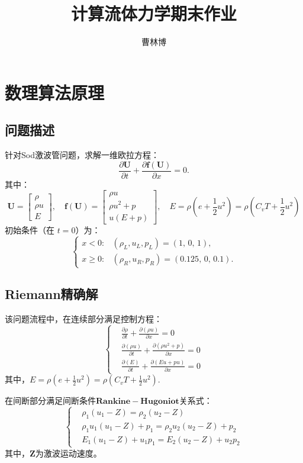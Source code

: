 \documentclass[12pt,a4paper]{article}%
\title{\fontsize{18pt}{27pt}\selectfont%
	{\heiti%
		计算流体力学期末作业}}%
\author{\fontsize{12pt}{18pt}\selectfont%
	{\fangsong%
		曹林博 \quad 2200011012}} %
\date{}%
\begin{document}
	\maketitle
	
	\section{数理算法原理}
		\subsection{问题描述}
		针对Sod激波管问题，求解一维欧拉方程：
		\[
		 	\frac{\partial \mathbf{U}}{\partial t} + \frac{\partial \mathbf{f}(\mathbf{U})}{\partial x} = 0.
		\]
		其中：
		\[
		\mathbf{U} = 
		\begin{bmatrix}
		 	\rho \\
		 	\rho u \\
		 	E
		\end{bmatrix}, \quad
		\mathbf{f}(\mathbf{U}) = 
		\begin{bmatrix}
		 	\rho u \\
		 	\rho u^2 + p \\
		 	u(E + p)
		\end{bmatrix}, \quad
		E = \rho (e + \frac12 u^2) = \rho \left( C_v T + \frac{1}{2} u^2 \right)
		\]
		初始条件（在 $t=0$）为：
		\[
		\begin{cases}
		 	x < 0: & (\rho_L, u_L, p_L) = (1,\, 0,\, 1), \\
		 	x \ge 0: & (\rho_R, u_R, p_R) = (0.125,\, 0,\, 0.1).
		\end{cases}
		\]
		
		\subsection{Riemann精确解}
		该问题流程中，在连续部分满足控制方程：
		\[
		\left\{
		\begin{aligned}
		 	&\frac{\partial \rho}{\partial t} + \frac{\partial (\rho u)}{\partial x} = 0 \\
		 	&\frac{\partial (\rho u)}{\partial t} + \frac{\partial (\rho u^2 + p)}{\partial x} = 0 \\
		 	&\frac{\partial (E)}{\partial t} + \frac{\partial (E u + p u)}{\partial x} = 0
		\end{aligned}
		\right.
		\]
		其中，$E = \rho (e + \frac12 u^2) = \rho (C_v T + \frac{1}{2} u^2)$.
		
		在间断部分满足间断条件$\mathbf{Rankine-Hugoniot}$关系式：
		\[
		\left\{
		\begin{aligned}
		 	& \rho_1(u_1 - Z) = \rho_2(u_2 - Z) \\
		 	& \rho_1 u_1(u_1 - Z) + p_1 = \rho_2 u_2(u_2 - Z) + p_2 \\
		 	& E_1(u_1 - Z) + u_1 p_1 = E_2(u_2 - Z) + u_2 p_2
		\end{aligned}
		\right.
		\]
		其中，$\mathbf{Z}$为激波运动速度。
		
\end{document}
